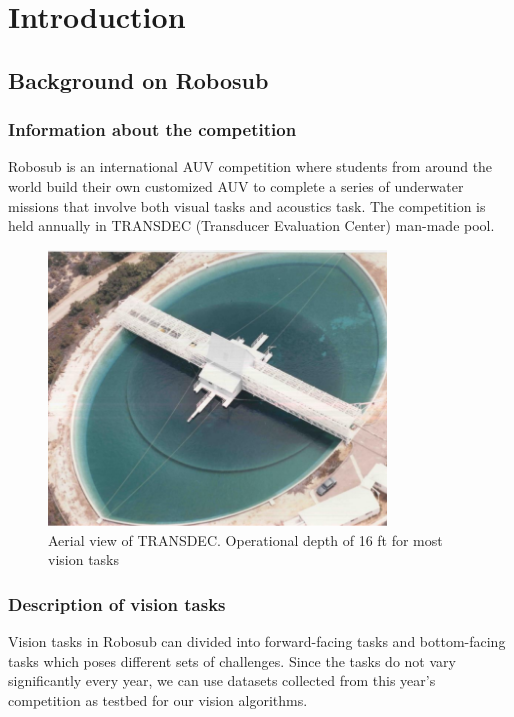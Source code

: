 \documentclass[fypca]{socreport}
\begin{document}
\listoffigures
\listoftables
\tableofcontents

\chapter{Introduction}

\section{Background on Robosub}

\subsection{Information about the competition}
Robosub is an international AUV competition where students from around the world build their own customized AUV to complete a series of underwater missions that involve both visual tasks and acoustics task. The competition is held annually in TRANSDEC (Transducer Evaluation Center) man-made pool.

\begin{figure}[ht]
\centering

        \includegraphics[width=0.8\textwidth, height=0.3\textheight]{transdec_aerial.png}
        \caption{Aerial view of TRANSDEC. Operational depth of 16 ft for most vision tasks}
        \label{fig:transdec_aerial}

\end{figure}

\subsection{Description of vision tasks}
Vision tasks in Robosub can divided into forward-facing tasks and bottom-facing tasks which poses different sets of challenges. Since the tasks do not vary significantly every year, we can use datasets collected from this year's competition as testbed for our vision algorithms.
\end{document}
